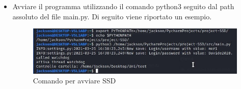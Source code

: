 \begin{itemize}
\item Avviare il programma utilizzando il comando python3 seguito dal path assoluto del file main.py. Di seguito viene riportato un esempio.
\begin{figure}[H]
    \centering
    \includegraphics[scale = 0.65]{components/img/linux-istruzione-1.jpg}
    \caption{ Comando per avviare SSD}
    \label{fig:comando per impostare PYTHONPATH su windows}
\end{figure}

\end{itemize}